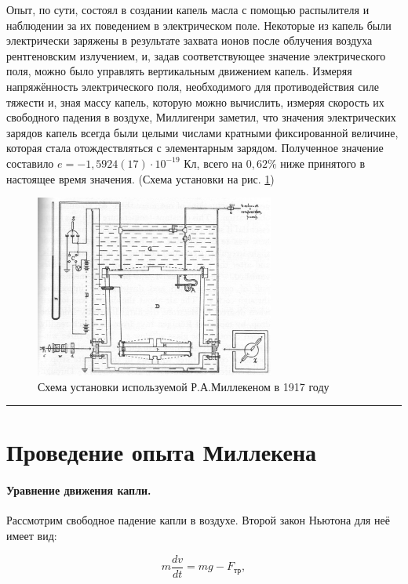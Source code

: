 \documentclass[a4paper,12pt]{article} %
\begin{document}
Опыт, по сути, состоял в создании капель масла с помощью распылителя и наблюдении за их поведением в электрическом поле. Некоторые из капель были электрически заряжены в результате захвата ионов после облучения воздуха рентгеновским излучением, и, задав соответствующее значение электрического поля, можно было управлять вертикальным движением капель. Измеряя напряжённость электрического поля, необходимого для противодействия силе тяжести и, зная массу капель, которую можно вычислить, измеряя скорость их свободного падения в воздухе, Миллигенри заметил, что значения электрических зарядов капель всегда были целыми числами кратными фиксированной величине, которая стала отождествляться с элементарным зарядом. Полученное значение составило $e = -1,5924(17) \cdot 10^{-19}$ Кл, всего на $0,62 \%$ ниже принятого в настоящее время значения. (Схема установки на рис. \ref{millakan})


\begin{figure}[h]
\centering
\includegraphics[width=0.7\textwidth]{millakin.jpg}
\caption{Схема установки используемой Р.А.Миллекеном в 1917 году}
\label{millakan}
\end{figure}

\medskip\hrule\medskip

\section{Проведение опыта Миллекена}

\paragraph{Уравнение движения капли.} Рассмотрим свободное падение капли в воздухе. Второй закон Ньютона для неё имеет вид:

\begin{equation}
m\frac{dv}{dt} = mg - F_\text{тр}, \label{2new}
\end{equation} 
\end{document}
